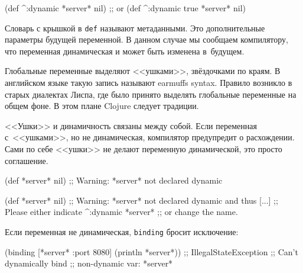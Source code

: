 \begin{english}
  \begin{clojure}
(def ^:dynamic *server* nil)
;; or
(def ^{:dynamic true} *server* nil)
  \end{clojure}
\end{english}

Словарь с крышкой в \verb|def| называют метаданными. Это дополнительные
параметры будущей переменной. В данном случае мы сообщаем компилятору, что
переменная динамическая и может быть изменена в~будущем.

Глобальные переменные выделяют <<ушками>>, звёздочками по краям. В английском
языке такую запись называют earmuffs syntax. Правило возникло в старых диалектах
Лиспа, где было принято выделять глобальные переменные на общем фоне. В этом
плане Clojure следует традиции.


<<Ушки>> и динамичность связаны между собой. Если переменная с~<<ушками>>, но не
динамическая, компилятор предупредит о расхождении. Сами по себе <<ушки>> не
делают переменную динамической, это просто соглашение.

\pagebreakafive

\ifnarrow

\begin{english}
  \begin{clojure}
(def *server* nil)
;; Warning: *server* not declared dynamic
  \end{clojure}
\end{english}

\else

\begin{english}
  \begin{clojure}
(def *server* nil)
;; Warning: *server* not declared dynamic and thus [...]
;; Please either indicate ^:dynamic *server*
;; or change the name.
  \end{clojure}
\end{english}

\fi

\noindent
Если переменная не динамическая, \verb|binding| бросит исключение:

\ifnarrow

\begin{english}
  \begin{clojure}
(binding [*server* {:port 8080}]
  (println *server*))
;; IllegalStateException
;; Can't dynamically bind
;; non-dynamic var: *server*
  \end{clojure}
\end{english}

